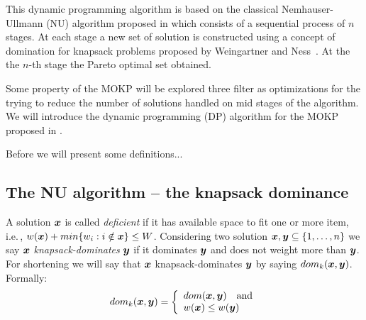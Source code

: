 

This dynamic programming algorithm is based on the classical Nemhauser-Ullmann (NU) algorithm proposed
in \cite{nemhauser1969discrete} which consists of a sequential process of $n$ stages.
At each stage a new set of solution is constructed using a concept of domination for knapsack problems
proposed by Weingartner and Ness~\cite{weingartner1967methods}.
At the the $n$-th stage the Pareto optimal set obtained.

Some property of the MOKP will be explored
three filter as optimizations for the trying
to reduce the number of solutions
handled on mid stages of the algorithm.
We will introduce the dynamic programming (DP) algorithm for the MOKP proposed in \cite{bazgan2009}.

Before we will present some definitions...

\subsection{The NU algorithm -- the knapsack dominance}

A solution $\boldsymbol{x}$ is called \emph{deficient} if it has available space
to fit one or more item, i.e.\,, $w(\boldsymbol{x}) + min\{ w_i : i \notin \boldsymbol{x} \} \leq W$.
Considering two solution $\boldsymbol{x}, \boldsymbol{y} \subseteq \{1, \ldots, n\}$ we say
$\boldsymbol{x}$ \emph{knapsack-dominates} $\boldsymbol{y}$ if it dominates $\boldsymbol{y}$ and
does not weight more than $\boldsymbol{y}$.
For shortening we will say that $\boldsymbol{x}$ knapsack-dominates $\boldsymbol{y}$ by saying $dom_k(\boldsymbol{x}, \boldsymbol{y})$.
Formally:
\begin{displaymath}
    dom_k(\boldsymbol{x}, \boldsymbol{y}) = \left\{
      \begin{array}{l}
          dom(\boldsymbol{x}, \boldsymbol{y}) \quad \text{and}\\
          w(\boldsymbol{x}) \leq w(\boldsymbol{y})
  \end{array} \right.
\end{displaymath}

